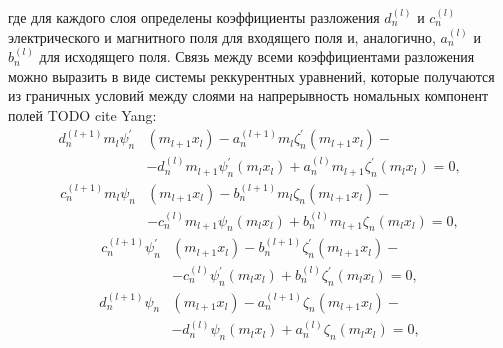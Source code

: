 где для каждого слоя определены коэффициенты разложения $d_n^{(l)}$ и
$c_n^{(l)}$ электрического и магнитного поля для входящего поля и,
аналогично, $a_n^{(l)}$ и $b_n^{(l)}$ для исходящего поля.  Связь
между всеми коэффициентами разложения можно выразить в виде системы
реккурентных уравнений, которые получаются из граничных условий между
слоями на напрерывность номальных компонент полей TODO cite Yang:
\begin{equation} %
  \label{eq:A2d1}
    \begin{alignedat}{2}
d^{(l+1)}_{n}m_{l} \psi^{\prime}_{n}&{\left (m_{l+1} x_{l} \right )}
- a^{(l+1)}_{n} m_{l} \zeta^{\prime}_{n}{\left (m_{l+1} x_{l} \right )}-\\
& - d^{(l)}_{n} m_{l+1} \psi^{\prime}_{n}{\left (m_{l} x_{l} \right )} 
+ a^{(l)}_{n} m_{l+1} \zeta^{\prime}_{n}{\left (m_{l} x_{l} \right )}
= 0,
\end{alignedat}
\end{equation}
\begin{equation} %
  \label{eq:A2d2}
\begin{alignedat}{2}
c^{(l+1)}_{n} m_{l} \psi_{n}&{\left (m_{l+1} x_{l} \right )}
  - b^{(l+1)}_{n} m_{l} \zeta_{n}{\left (m_{l+1} x_{l} \right )}-\\
&- c^{(l)}_{n} m_{l+1} \psi_{n}{\left (m_{l} x_{l} \right )} 
+b^{(l)}_{n} m_{l+1} \zeta_{n}{\left (m_{l} x_{l} \right )}  =0,
\end{alignedat}
\end{equation}
\begin{equation} %
  \label{eq:A2d3}
\begin{alignedat}{2}
c^{(l+1)}_{n} \psi^{\prime}_{n}&{\left (m_{l+1} x_{l} \right )}
- b^{(l+1)}_{n} \zeta^{\prime}_{n}{\left (m_{l+1} x_{l} \right )}-\\
&- c^{(l)}_{n} \psi^{\prime}_{n}{\left (m_{l} x_{l} \right )} 
+b^{(l)}_{n} \zeta^{\prime}_{n}{\left (m_{l} x_{l} \right )}   =0,
\end{alignedat}
\end{equation}
\begin{equation} %
  \label{eq:A2d4}
\begin{alignedat}{2}
 d^{(l+1)}_{n} \psi_{n}&{\left (m_{l+1} x_{l} \right )}
- a^{(l+1)}_{n} \zeta_{n}{\left (m_{l+1} x_{l} \right )}-\\
& - d^{(l)}_{n} \psi_{n}{\left (m_{l} x_{l} \right )} 
+ a^{(l)}_{n} \zeta_{n}{\left (m_{l} x_{l} \right )}   =0,
\end{alignedat}
\end{equation}
